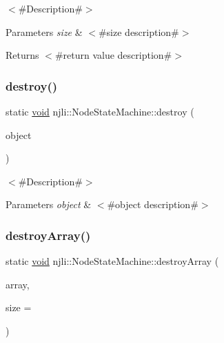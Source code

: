 $<$\#\+Description\#$>$


\begin{DoxyParams}{Parameters}
{\em size} & $<$\#size description\#$>$\\
\hline
\end{DoxyParams}
\begin{DoxyReturn}{Returns}
$<$\#return value description\#$>$ 
\end{DoxyReturn}
\mbox{\label{classnjli_1_1_node_state_machine_ad8f04819d6afdbea47415ab4004fde0d}} 
\subsubsection{\texorpdfstring{destroy()}{destroy()}}
{\footnotesize\ttfamily static \mbox{\hyperlink{_thread_8h_af1e856da2e658414cb2456cb6f7ebc66}{void}} njli\+::\+Node\+State\+Machine\+::destroy (\begin{DoxyParamCaption}\item[{\mbox{\hyperlink{classnjli_1_1_node_state_machine}{Node\+State\+Machine}} $\ast$}]{object }\end{DoxyParamCaption})\hspace{0.3cm}{\ttfamily [static]}}

$<$\#\+Description\#$>$


\begin{DoxyParams}{Parameters}
{\em object} & $<$\#object description\#$>$ \\
\hline
\end{DoxyParams}
\mbox{\label{classnjli_1_1_node_state_machine_a79dabd3b695231fa3700098199574caa}} 
\subsubsection{\texorpdfstring{destroy\+Array()}{destroyArray()}}
{\footnotesize\ttfamily static \mbox{\hyperlink{_thread_8h_af1e856da2e658414cb2456cb6f7ebc66}{void}} njli\+::\+Node\+State\+Machine\+::destroy\+Array (\begin{DoxyParamCaption}\item[{\mbox{\hyperlink{classnjli_1_1_node_state_machine}{Node\+State\+Machine}} $\ast$$\ast$}]{array,  }\item[{const \mbox{\hyperlink{_util_8h_a10e94b422ef0c20dcdec20d31a1f5049}{u32}}}]{size = {} }\end{DoxyParamCaption})\hspace{0.3cm}{\ttfamily [static]}}

